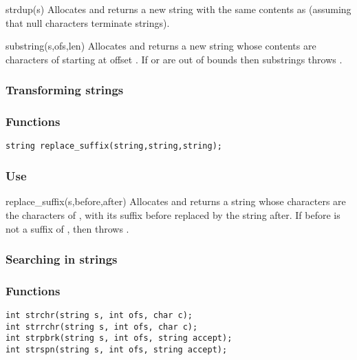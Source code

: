 \begin{defun}{strdup}{(s)}
Allocates and returns a new string with the same contents as 
(assuming that null characters terminate strings).
\end{defun}

\begin{defun}{substring}{(s,ofs,len)}
Allocates and returns a new string whose contents are 
characters of  starting at offset .  If  or
 are out of bounds then substrings throws
.
\end{defun}

\subsubsection*{Transforming strings}
\subsubsection*{Functions}
\begin{verbatim}
string replace_suffix(string,string,string);
\end{verbatim}

\subsubsection*{Use}

\begin{defun}{replace_suffix}{(s,before,after)}
Allocates and returns a string whose characters are the characters of
, with its suffix before replaced by the string after.  If before
is not a suffix of , then  throws
.
\end{defun}

\subsubsection*{Searching in strings}
\subsubsection*{Functions}
\begin{verbatim}
int strchr(string s, int ofs, char c);
int strrchr(string s, int ofs, char c);
int strpbrk(string s, int ofs, string accept);
int strspn(string s, int ofs, string accept);
\end{verbatim}

